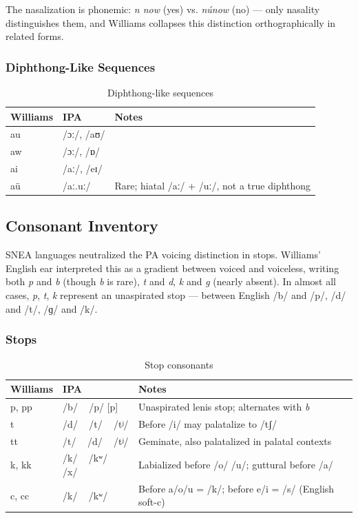 The nasalization is phonemic: \textit{n now} (yes) vs. \textit{núnow} (no)
--- only nasality distinguishes them, and Williams collapses this distinction
orthographically in related forms.

\subsubsection{Diphthong-Like Sequences}

\begin{table}[h]
\centering
\begin{tabular}{lll}
\toprule
Williams & IPA & Notes \\
\midrule
au & /ɔː/, /aʊ/ & \\
aw & /ɔː/, /ɒ/ & \\
ai & /aː/, /eɪ/ & \\
aü & /aː.uː/ & Rare; hiatal /aː/ + /uː/, not a true diphthong \\
\bottomrule
\end{tabular}
\caption{Diphthong-like sequences}
\label{tab:1362-diphthongs}
\end{table}

\subsection{Consonant Inventory}

SNEA languages neutralized the PA voicing distinction in stops. Williams'
English ear interpreted this as a gradient between voiced and voiceless,
writing both \textit{p} and \textit{b} (though \textit{b} is rare),
\textit{t} and \textit{d}, \textit{k} and \textit{g} (nearly absent). In
almost all cases, \textit{p}, \textit{t}, \textit{k} represent an unaspirated
stop --- between English /b/ and /p/, /d/ and /t/, /ɡ/ and /k/.

\subsubsection{Stops}

\begin{table}[h]
\centering
\begin{tabular}{lll}
\toprule
Williams & IPA & Notes \\
\midrule
p, pp & /b/ ~ /p/ [p] & Unaspirated lenis stop; alternates with \textit{b} \\
t & /d/ ~ /t/ ~ /tʲ/ & Before /i/ may palatalize to /tʃ/ \\
tt & /t/ ~ /d/ ~ /tʲ/ & Geminate, also palatalized in palatal contexts \\
k, kk & /k/ ~ /kʷ/ ~ /x/ & Labialized before /o/ /u/; guttural before /a/ \\
c, cc & /k/ ~ /kʷ/ & Before a/o/u = /k/; before e/i = /s/ (English soft-c) \\
\bottomrule
\end{tabular}
\caption{Stop consonants}
\label{tab:1362-stops}
\end{table}

